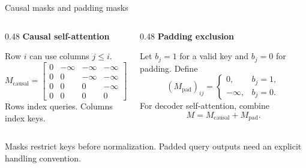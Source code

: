 \documentclass[aspectratio=169,11pt]{beamer}
\newcommand{\lead}[1]{{\color{ink}\bfseries #1}\par\vspace{1.2mm}}
\newcommand{\src}[1]{\par\vfill{\fontsize{7}{8.5}\selectfont\color{muted}#1}\par}
\begin{document}
\begin{frame}[t]{Causal masks and padding masks}
\begin{columns}[T,onlytextwidth]
\begin{column}{0.48\textwidth}
\lead{Causal self-attention}
Row $i$ can use columns $j\leq i$.
\[
 M_{\mathrm{causal}}=
 \begin{bmatrix}
  0&-\infty&-\infty&-\infty\\
  0&0&-\infty&-\infty\\
  0&0&0&-\infty\\
  0&0&0&0
 \end{bmatrix}.
\]
Rows index queries.
Columns index keys.
\end{column}
\begin{column}{0.48\textwidth}
\lead{Padding exclusion}
Let $b_j=1$ for a valid key and $b_j=0$ for padding. Define
\[
 (M_{\mathrm{pad}})_{ij}=
 \begin{cases}0,&b_j=1,\\-\infty,&b_j=0.\end{cases}
\]
For decoder self-attention, combine
\[M=M_{\mathrm{causal}}+M_{\mathrm{pad}}.\]
\end{column}
\end{columns}
\src{Masks restrict keys before normalization. Padded query outputs need an explicit handling convention.}
\end{frame}
\end{document}
